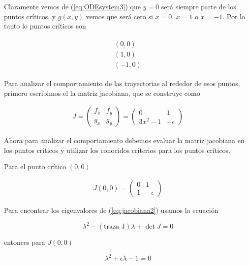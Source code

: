 \documentclass[a4paper,10pt]{article}
\begin{document}
Claramente vemos de (\ref{eq:ODEsystem3}) que $y=0$ será siempre parte de los puntos críticos,
y $g(x,y)$ vemos que será cero si $x=0$, $x=1$ o $x=-1$. Por lo tanto lo puntos críticos son

\begin{align}
 \begin{split}
  (0,0) \\
  (1,0) \\
  (-1,0) 
 \label{eq:puntoscriticos1}
 \end{split}
\end{align}

Para analizar el comportamiento de las trayectorias al rededor de esos puntos, primero escribimos 
el la matriz jacobiana, que se construye como


\begin{align}
J = \begin{pmatrix}
     f_x & f_y \\
     g_x & g_y
\end{pmatrix} = \begin{pmatrix}
		0 & 1 \\
		3x^2 -1 & -\epsilon
		\end{pmatrix}
\label{eq:jacobiana1}
\end{align}

Ahora para analizar el comportamiento debemos evaluar la matriz jacobiana en los puntos
críticos y utilizar los conocidos criterios para los puntos críticos. 

\vspace{.3cm}

Para el punto crítico $(0,0)$

\begin{align}
J(0,0) = \begin{pmatrix}
     0 & 1 \\
     1 & -\epsilon
\end{pmatrix}
\label{eq:jacobiana2}
\end{align}

Para encontrar los eigenvalores de (\ref{eq:jacobiana2}) usamos la ecuación

\begin{equation}
 \lambda^2 - (\text{traza J}) \lambda + \det{J} = 0
 \label{eq:calcEigenvalores}
\end{equation}

entonces para $J(0,0)$

\begin{equation}
 \lambda^2 + \epsilon \lambda - 1 = 0
\end{equation}
\end{document}
